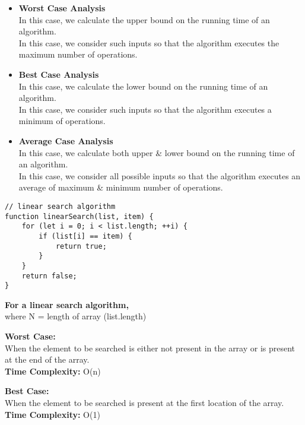 \begin{itemize}
	\tightlist
	\item
	      \protect\hypertarget{0bb4}{}{\textbf{Worst Case Analysis}\\
	      	In this case, we calculate the upper bound on the running time of an
	      	algorithm.\\
	      	In this case, we consider such inputs so that the algorithm executes
	      the maximum number of operations.}
	\item
	      \protect\hypertarget{da36}{}{\textbf{Best Case Analysis}\\
	      	In this case, we calculate the lower bound on the running time of an
	      	algorithm.\\
	      	In this case, we consider such inputs so that the algorithm executes a
	      minimum of operations.}
	\item
	      \protect\hypertarget{b06a}{}{\textbf{Average Case Analysis}\\
	      	In this case, we calculate both upper \& lower bound on the running
	      	time of an algorithm.\\
	      	In this case, we consider all possible inputs so that the algorithm
	      	executes an average of maximum \& minimum number of operations.}
\end{itemize}

\hypertarget{937f}{\label{937f}}

\begin{verbatim}
// linear search algorithm
function linearSearch(list, item) {
    for (let i = 0; i < list.length; ++i) {
        if (list[i] == item) {
            return true;
        }
    }
    return false;
}
\end{verbatim}

\hypertarget{8c7c}{\label{8c7c}}

\textbf{For a linear search algorithm,}\\
where N = length of array (list.length)

\textbf{Worst Case:}\\
When the element to be searched is either not present in the array or is
present at the end of the array.\\
\textbf{Time Complexity:} O(n)

\textbf{Best Case:}\\
When the element to be searched is present at the first location of the
array.\\
\textbf{Time Complexity:} O(1)

